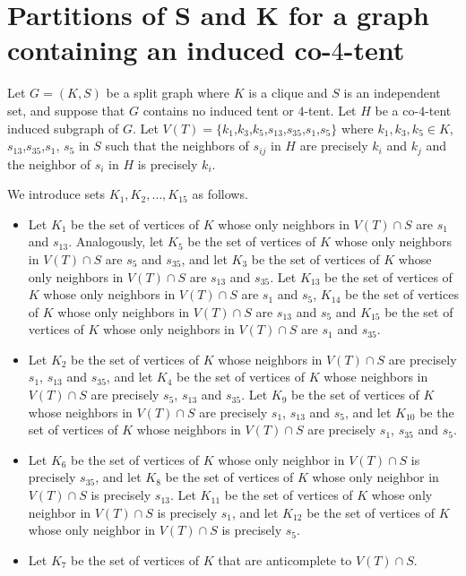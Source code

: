 \documentclass[12pt]{book}
\theoremstyle{plain}
\theoremstyle{remark}
\begin{document}
\section{Partitions of S and K for a graph containing an induced co-$4$-tent} \label{sec:co4tent_partition}

Let $G=(K,S)$ be a split graph where $K$ is a clique and $S$ is an independent set, and suppose that $G$ contains no induced tent or $4$-tent. 
Let $H$ be a co-$4$-tent induced subgraph of $G$. Let $V(T)=\{k_1$,$k_3$,$k_5$,$s_{13}$,$s_{35}$,$s_1$,$s_5\}$ where $k_1,k_3,k_5\in K$, $s_{13}$,$s_{35}$,$s_1$, $s_5$ in $S$ such that the neighbors of $s_{ij}$ in $H$ are precisely $k_i$ and $k_j$ and the neighbor of $s_i$ in $H$ is precisely $k_i$.

We introduce sets $K_1,K_2,\ldots,K_{15}$ as follows.
\begin{itemize}
 \item Let $K_1$ be the set of vertices of $K$ whose only neighbors in $V(T)\cap S$ are $s_1$ and $s_{13}$. Analogously, let $K_5$ be the set of vertices of $K$ whose only neighbors in $V(T)\cap S$ are $s_5$ and $s_{35}$, and let $K_3$ be the set of vertices of $K$ whose only neighbors in $V(T)\cap S$ are $s_{13}$ and $s_{35}$. Let $K_{13}$ be the set of vertices of $K$ whose only neighbors in $V(T)\cap S$ are $s_1$ and $s_5$, $K_{14}$ be the set of vertices of $K$ whose only neighbors in $V(T)\cap S$ are $s_{13}$ and $s_5$ and $K_{15}$ be the set of vertices of $K$ whose only neighbors in $V(T)\cap S$ are $s_1$ and $s_{35}$.
 \item Let $K_2$ be the set of vertices of $K$ whose neighbors in $V(T)\cap S$ are precisely $s_1$, $s_{13}$ and $s_{35}$, and let $K_4$ be the set of vertices of $K$ whose neighbors in $V(T)\cap S$ are precisely $s_5$, $s_{13}$ and $s_{35}$. Let $K_9$ be the set of vertices of $K$ whose neighbors in $V(T)\cap S$ are precisely $s_1$, $s_{13}$ and $s_5$, and let $K_{10}$ be the set of vertices of $K$ whose neighbors in $V(T)\cap S$ are precisely $s_1$, $s_{35}$ and $s_5$.
 \item Let $K_6$ be the set of vertices of $K$ whose only neighbor in $V(T)\cap S$ is precisely $s_{35}$, and let $K_8$ be the set of vertices of $K$ whose only neighbor in $V(T)\cap S$ is precisely $s_{13}$. Let $K_{11}$ be the set of vertices of $K$ whose only neighbor in $V(T)\cap S$ is precisely $s_1$, and let $K_{12}$ be the set of vertices of $K$ whose only neighbor in $V(T)\cap S$ is precisely $s_5$.
 \item Let $K_7$ be the set of vertices of $K$ that are anticomplete to $V(T) \cap S$.
 
\end{itemize}
\end{document}

